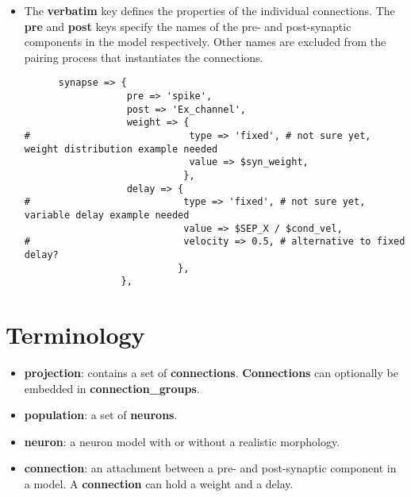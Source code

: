 \documentclass[12pt]{article}
\begin{document}
\begin{itemize}
\item The {\bf verbatim} key defines the properties of the individual
  connections.  The {\bf pre} and {\bf post} keys specify the names of
  the pre- and post-synaptic components in the model respectively.
  Other names are excluded from the pairing process that instantiates
  the connections.
\begin{verbatim}
      synapse => {
                  pre => 'spike',
                  post => 'Ex_channel',
                  weight => {
#                            type => 'fixed', # not sure yet, weight distribution example needed
                             value => $syn_weight,
                            },
                  delay => {
#                           type => 'fixed', # not sure yet, variable delay example needed
                            value => $SEP_X / $cond_vel,
#                           velocity => 0.5, # alternative to fixed delay?
                           },
                 },
\end{verbatim}
\end{itemize}


\section*{Terminology}

\begin{itemize}
\item[] {\bf projection}: contains a set of {\bf connections}.  {\bf
    Connections} can optionally be embedded in {\bf
    connection\_groups}.
\item[] {\bf population}: a set of {\bf neurons}.
\item[] {\bf neuron}: a neuron model with or without a realistic
  morphology.
\item[] {\bf connection}: an attachment between a pre- and
  post-synaptic component in a model.  A {\bf connection} can hold a
  weight and a delay.
\end{itemize}
\end{document}
